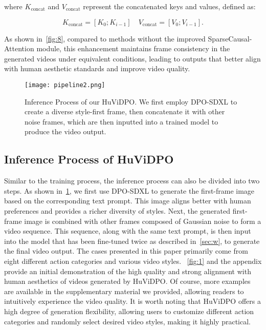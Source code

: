 where \(K_{\text{concat}}\) and \(V_{\text{concat}}\) represent the concatenated keys and values, defined as:

\begin{equation}
K_{\text{concat}} = [K_0; K_{i-1}] \quad V_{\text{concat}} = [V_0; V_{i-1}].
\label{eq:concat_key}
\end{equation}

As shown in~\cref{fig:8}, compared to methods without the improved SparseCausal-Attention module, this enhancement maintains frame consistency in the generated videos under equivalent conditions, leading to outputs that better align with human aesthetic standards and improve video quality. 



\begin{figure}[!h]
  \centering
    \texttt{[image: pipeline2.png]}

   \caption{Inference Process of our HuViDPO. We first employ DPO-SDXL to create a diverse style-first frame, then concatenate it with other noise frames, which are then inputted into a trained model to produce the video output.}
   \label{fig:4}
\end{figure}


\subsection{Inference Process of HuViDPO}
\label{sec:r}

Similar to the training process, the inference process can also be divided into two steps. As shown in~\cref{fig:4}, we first use DPO-SDXL to generate the first-frame image based on the corresponding text prompt. This image aligns better with human preferences and provides a richer diversity of styles. Next, the generated first-frame image is combined with other frames composed of Gaussian noise to form a video sequence. This sequence, along with the same text prompt, is then input into the model that has been fine-tuned twice as described in~\cref{sec:w}, to generate the final video output. The cases presented in this paper primarily come from eight different action categories and various video styles. ~\cref{fig:1} and the appendix provide an initial demonstration of the high quality and strong alignment with human aesthetics of videos generated by HuViDPO. Of course, more examples are available in the supplementary material we provided, allowing readers to intuitively experience the video quality. It is worth noting that HuViDPO offers a high degree of generation flexibility, allowing users to customize different action categories and randomly select desired video styles, making it highly practical.



